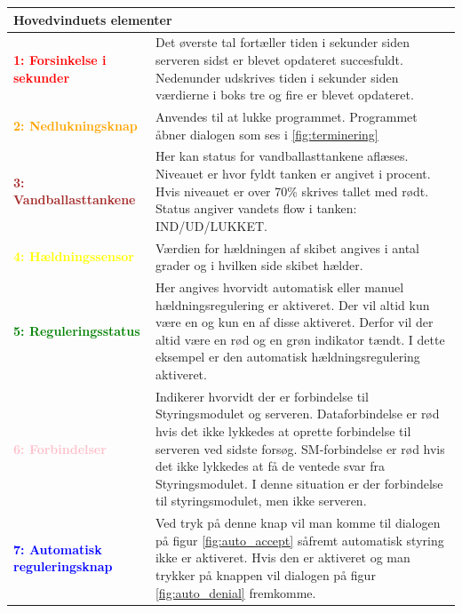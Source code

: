 \begin{table}[H]
\begin{center}

\begin{tabular}{| l | p{9.5cm} | }

\multicolumn{2}{l}{Hovedvinduets elementer} \\
\hline
\textcolor{red}{\textbf{1: Forsinkelse i sekunder}}
&Det øverste tal fortæller tiden i sekunder siden serveren sidst er blevet opdateret succesfuldt.
Nedenunder udskrives tiden i sekunder siden værdierne i boks tre og fire er blevet opdateret.\\\hline

\textcolor{Orange}{\textbf{2: Nedlukningsknap}}
&Anvendes til at lukke programmet. Programmet åbner dialogen som ses i \ref{fig:terminering}\\\hline

\textcolor{brown}{\textbf{3: Vandballasttankene}}
&Her kan status for vandballasttankene aflæses. Niveauet er hvor fyldt tanken er angivet i procent. Hvis niveauet er over 70\% skrives tallet med rødt.
Status angiver vandets flow i tanken: IND/UD/LUKKET.\\\hline

\textcolor{yellow}{\textbf{4: Hældningssensor}}
&Værdien for hældningen af skibet angives i antal grader og i hvilken side skibet hælder.\\\hline

\textcolor{green}{\textbf{5: Reguleringsstatus}}
&Her angives hvorvidt automatisk eller manuel hældningsregulering er aktiveret. Der vil altid kun være en og kun en af disse aktiveret. Derfor vil der altid være en rød og en grøn indikator tændt. I dette eksempel er den automatisk hældningsregulering aktiveret.\\\hline

\textcolor{pink}{\textbf{6: Forbindelser}}
&Indikerer hvorvidt der er forbindelse til Styringsmodulet og serveren. Dataforbindelse er rød hvis det ikke lykkedes at oprette forbindelse til serveren ved sidste forsøg.
SM-forbindelse er rød hvis det ikke lykkedes at få de ventede svar fra Styringsmodulet.
I denne situation er der forbindelse til styringsmodulet, men ikke serveren.\\\hline

\textcolor{blue}{\textbf{7: Automatisk reguleringsknap}}
&Ved tryk på denne knap vil man komme til dialogen på figur \ref{fig:auto_accept} såfremt automatisk styring ikke er aktiveret. Hvis den er aktiveret og man trykker på knappen vil dialogen på figur \ref{fig:auto_denial} fremkomme.\\\hline


\end{tabular}
\end{center}
\end{table}
